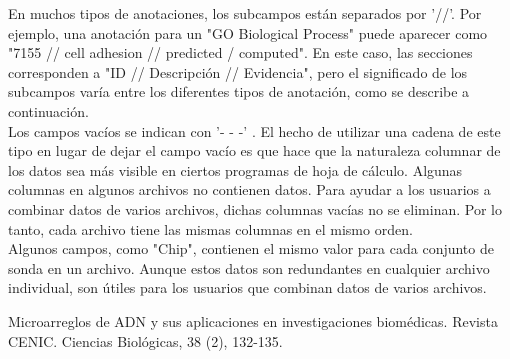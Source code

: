 \documentclass[12pt,letterpaper]{article}
\begin{document}
En muchos tipos de anotaciones, los subcampos están separados por '//'. Por ejemplo,  una anotación para un "GO Biological Process" puede aparecer como "7155 // cell adhesion // predicted / computed".  En este caso, las secciones corresponden a "ID // Descripción // Evidencia", pero el significado de los subcampos varía entre los diferentes tipos de anotación, como se describe a continuación.\\

Los campos vacíos se indican con '- - -' . El hecho de utilizar una cadena de este tipo en lugar de dejar el campo vacío es que hace que la naturaleza columnar de los datos sea más visible en ciertos programas de hoja de cálculo.
Algunas columnas en algunos archivos no contienen datos. Para ayudar a los usuarios a combinar datos de varios archivos, dichas columnas vacías no se eliminan. Por lo tanto, cada archivo tiene las mismas columnas en el mismo orden.\\

Algunos campos, como "Chip", contienen el mismo valor para cada conjunto de sonda en un archivo. Aunque estos datos son redundantes en cualquier archivo individual, son útiles para los usuarios que combinan datos de varios archivos.

\begin{thebibliography}{XXX0000}
   Microarreglos de ADN y sus aplicaciones en investigaciones biomédicas. Revista CENIC. Ciencias Biológicas, 38 (2), 132-135. 
\end{thebibliography} 	
\end{document}
